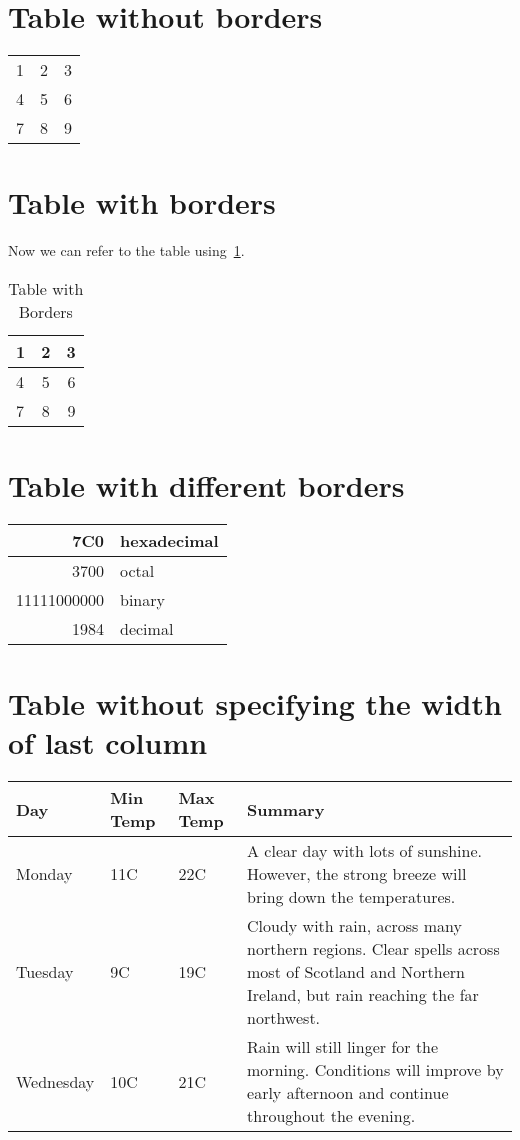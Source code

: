 \documentclass{article}
\begin{document}
\section{Table without borders}

\begin{tabular}{l c r}

1 & 2 & 3 \\
4 & 5 & 6 \\
7 & 8 & 9 \\
\end{tabular}

\section{Table with borders}
Now we can refer to the table using~\cref{t:borders}.
\begin{table}[h]
\caption{Table with Borders}
\centering
\label{t:borders}
\begin{tabular}{|l|c| r|}

\hline
1 & 2 & 3 \\ \hline
4 & 5 & 6 \\ \hline
7 & 8 & 9 \\ \hline
\end{tabular}
\end{table}


\section{Table with different borders}

\begin{tabular}{|r|l|}
  \hline
  7C0 & hexadecimal \\\hline
  3700 & octal \\ \cline{2-2}
  11111000000 & binary \\  \hline \hline
  1984 & decimal \\   \hline
\end{tabular}

\section{Table without specifying the width of last column}

\begin{center}
    \begin{tabular}{ | l | l | l | l |}
    \hline
    Day & Min Temp & Max Temp & Summary \\ \hline
    Monday & 11C & 22C & A clear day with lots of sunshine.
    However, the strong breeze will bring down the temperatures. \\ \hline
    Tuesday & 9C & 19C & Cloudy with rain, across many northern regions. Clear spells
    across most of Scotland and Northern Ireland,
    but rain reaching the far northwest. \\ \hline
    Wednesday & 10C & 21C & Rain will still linger for the morning.
    Conditions will improve by early afternoon and continue
    throughout the evening. \\    \hline
    \end{tabular}
\end{center}
\end{document}
